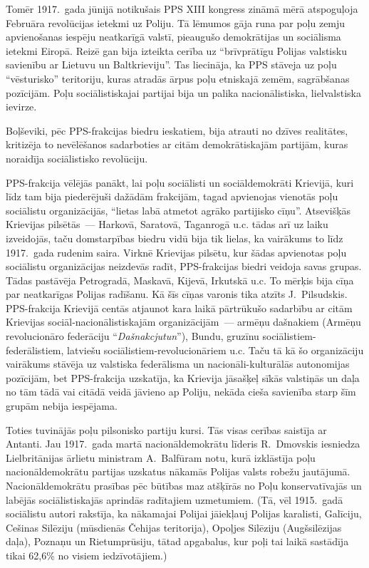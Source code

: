 \documentclass[twoside,a5paper,12pt,fleqn,openany]{extbook}
\begin{document}
Tomēr 1917.~gada jūnijā notikušais PPS XIII kongress zināmā mērā atspoguļoja Februāra revolūcijas ietekmi uz Poliju. Tā lēmumos gāja runa par poļu zemju apvienošanas iespēju neatkarīgā valstī, pieaugušo demokrātijas un sociālisma ietekmi Eiropā. Reizē gan bija izteikta cerība uz ``brīvprātīgu Polijas valstisku savienību ar Lietuvu un Baltkrieviju''. Tas liecināja, ka PPS stāveja uz poļu ``vēsturisko'' teritoriju, kuras atradās ārpus poļu etniskajā zemēm, sagrābšanas pozīcijām. Poļu sociālistiskajai partijai bija un palika nacionālistiska, lielvalstiska ievirze.

Boļševiki, pēc PPS-frakcijas biedru ieskatiem, bija atrauti no dzīves realitātes, kritizēja to nevēlēšanos sadarboties ar citām demokrātiskajām partijām, kuras noraidīja sociālistisko revolūciju.

PPS-frakcija vēlējās panākt, lai poļu sociālisti un sociāldemokrāti Krievijā, kuri līdz tam bija piederējuši dažādām frakcijām, tagad apvienojas vienotās poļu sociālistu organizācijās, ``lietas labā atmetot agrāko partijisko cīņu''. Atsevišķās Krievijas pilsētās~--- Harkovā, Saratovā, Taganrogā u.c. tādas arī uz laiku izveidojās, taču domstarpības biedru vidū bija tik lielas, ka vairākums to līdz 1917.~gada rudenim saira. Virknē Krievijas pilsētu, kur šādas apvienotas poļu sociālistu organizācijas neizdevās radīt, PPS-frakcijas biedri veidoja savas grupas. Tādas pastāvēja Petrogradā, Maskavā, Kijevā, Irkutskā u.c. To mērķis bija cīņa par neatkarīgas Polijas radīšanu. Kā šīs cīņas varonis tika atzīts J.~Pilsudskis. PPS-frakcija Krievijā centās atjaunot kara laikā pārtrūkušo sadarbību ar citām Krievijas sociāl-nacionālistiskajām organizācijām~--- armēņu dašnakiem (Armēņu revolucionāro federāciju ``\emph{Dašnakcjutun}''), Bundu, gruzīnu sociālistiem-federālistiem, latviešu sociālistiem-revolucionāriem u.c. Taču tā kā šo organizāciju vairākums stāvēja uz valstiska federālisma un nacionāli-kulturālās autonomijas pozīcijām, bet PPS-frakcija uzskatīja, ka Krievija jāsašķeļ sīkās valstiņās un daļa no tām tādā vai citādā veidā jāvieno ap Poliju, nekāda cieša savienība starp šīm grupām nebija iespējama.

Toties tuvinājās poļu pilsonisko partiju kursi. Tās visas cerības saistīja ar Antanti. Jau 1917.~gada martā nacionāldemokrātu līderis R.~Dmovskis iesniedza Lielbritānijas ārlietu ministram A.~Balfūram notu, kurā izklāstīja poļu nacionāldemokrātu partijas uzskatus nākamās Polijas valsts robežu jautājumā. Nacionāldemokrātu prasības pēc būtības maz atšķīrās no Poļu konservatīvajās un labējās sociālistiskajās aprindās radītajiem uzmetumiem. (Tā, vēl 1915.~gadā sociālistu autori rakstīja, ka nākamajai Polijai jāiekļauj Polijas karalisti, Galīciju, Cešinas Silēziju (mūsdienās Čehijas teritorija), Opoļjes Silēziju (Augšsilēzijas daļa), Poznaņu un Rietumprūsiju, tātad apgabalus, kur poļi tai laikā sastādīja tikai 62,6\% no visiem iedzīvotājiem.)
\end{document}
